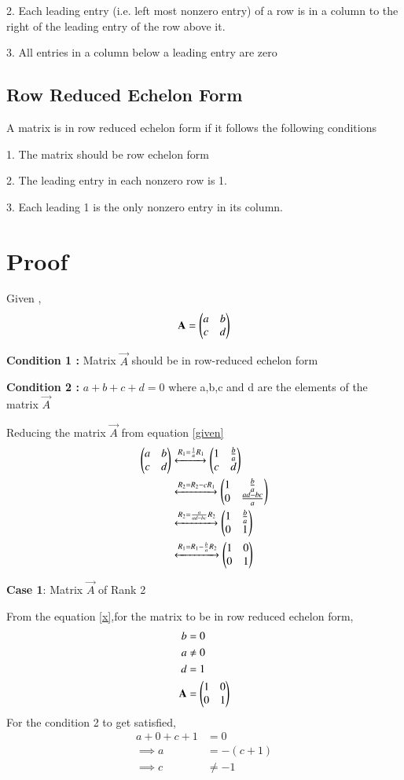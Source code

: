 \documentclass[journal,12pt,twocolumn]{IEEEtran}
\begin{document}
2. Each leading entry (i.e. left most nonzero entry) of a row is in a column to the right of the leading entry of the row above it.

3. All entries in a column below a leading entry are zero
\subsection{Row Reduced Echelon Form}
A matrix is in row reduced echelon form if it follows the following conditions

1. The matrix should be row echelon form 

2. The leading entry in each nonzero row is 1.

3. Each leading 1 is the only nonzero entry in its column.
\section{Proof}

Given ,
\begin{align}
    \mathbf{A}=\begin{pmatrix}a & b \\c & d\end{pmatrix}\label{given}
\end{align}

\textbf{Condition 1 :} Matrix $\vec{A}$ should be in row-reduced echelon form 

\textbf{Condition 2 :}  $a+b+c+d=0$ where a,b,c and d are the elements of the matrix $\vec{A}$

Reducing the matrix $\vec{A}$ from equation \eqref{given}
\begin{align}
\begin{pmatrix}a&b\\c&d\end{pmatrix}&\xleftrightarrow{R_1=\frac{1}{a}R_1}\begin{pmatrix}1&\frac{b}{a}\\c&d\end{pmatrix}\\
&\xleftrightarrow{R_2 = R_2-cR_1}\begin{pmatrix}1&\frac{b}{a}\\0&\frac{ad-bc}{a}\end{pmatrix}\label{x}\\
&\xleftrightarrow{R_2 = \frac{a}{ad-bc}R_2}\begin{pmatrix}1&\frac{b}{a}\\0&1\end{pmatrix}\\
&\xleftrightarrow{R_1 = R_1-\frac{b}{a}R_2}\begin{pmatrix}1&0\\0&1\end{pmatrix}\label{change}
\end{align}

\textbf{Case 1}: Matrix $\vec{A}$ of Rank 2

From the equation \eqref{x},for the matrix to be in row reduced echelon form,
\begin{align}
    b&=0\notag\\
    a&\not=0\notag\\
    d&=1\notag\\
    \mathbf{A}&=\begin{pmatrix}1 & 0 \\ 0 & 1\end{pmatrix}\label{r2}
\end{align}
For the condition 2 to get satisfied,
\begin{align}
    a+0+c+1&=0\\
    \implies a&=-(c+1)\\
    \implies c&\not=-1
\end{align}
\end{document}
